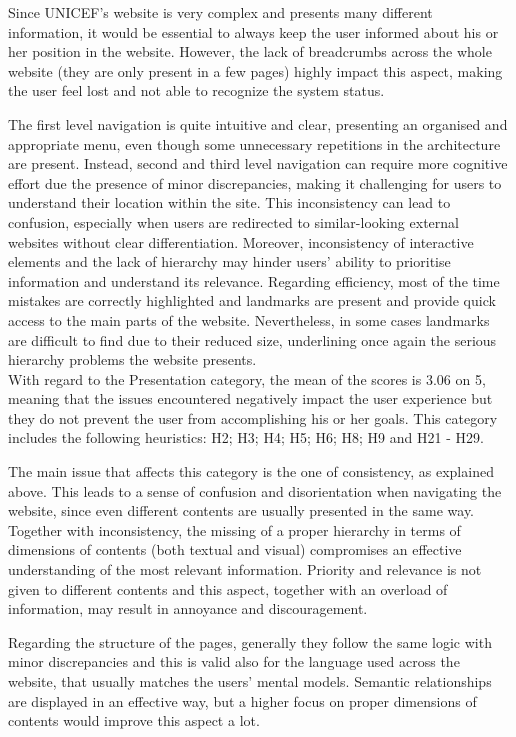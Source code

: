 Since UNICEF’s website is very complex and presents many different information, it would be essential to always keep the user informed about his or her position in the website. However, the lack of breadcrumbs across the whole website (they are only present in a few pages) highly impact this aspect, making the user feel lost and not able to recognize the system status.

The first level navigation is quite intuitive and clear, presenting an organised and appropriate menu, even though some unnecessary repetitions in the architecture are present. Instead, second and third level navigation can require more cognitive effort due the presence of minor discrepancies, making it challenging for users to understand their location within the site. This inconsistency can lead to confusion, especially when users are redirected to similar-looking external websites without clear differentiation. Moreover, inconsistency of interactive elements and the lack of hierarchy may hinder users' ability to prioritise information and understand its relevance.
Regarding efficiency, most of the time mistakes are correctly highlighted and landmarks are present and provide quick access to the main parts of the website. Nevertheless, in some cases landmarks are difficult to find due to their reduced size, underlining once again the serious hierarchy problems the website presents.\\

With regard to the Presentation category, the mean of the scores is 3.06 on 5, meaning that the issues encountered negatively impact the user experience but they do not prevent the user from accomplishing his or her goals. This category includes the following heuristics: H2; H3; H4; H5; H6; H8; H9 and H21 - H29.

The main issue that affects this category is the one of consistency, as explained above. This leads to a sense of confusion and disorientation when navigating the website, since even different contents are usually presented in the same way. Together with inconsistency, the missing of a proper hierarchy in terms of dimensions of contents (both textual and visual) compromises an effective understanding of the most relevant information. Priority and relevance is not given to different contents and this aspect, together with an overload of information, may result in annoyance and discouragement.

Regarding the structure of the pages, generally they follow the same logic with minor discrepancies and this is valid also for the language used across the website, that usually matches the users’ mental models. Semantic relationships are displayed in an effective way, but a higher focus on proper dimensions of contents would improve this aspect a lot.\\

